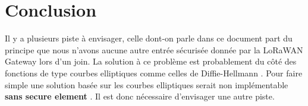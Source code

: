 \documentclass[a4paper, 11pt]{article}
\begin{document}
\section*{Conclusion}
Il y a plusieurs piste à envisager, celle dont-on parle dans ce document part du principe que nous n'avons aucune autre entrée sécurisée donnée par la LoRaWAN Gateway lors d'un join. La solution à ce problème est probablement du côté des fonctions de type courbes elliptiques comme celles de Diffie-Hellmann . Pour faire simple une solution basée sur les courbes elliptiques serait non implémentable \textbf{sans secure element} . Il est donc nécessaire d'envisager une autre piste. 
\end{document}
